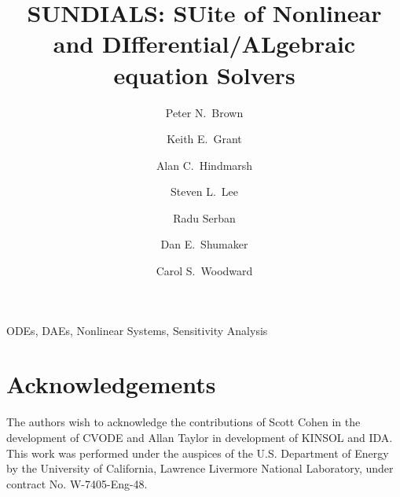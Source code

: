 \documentclass[11pt]{article}
\title{SUNDIALS: SUite of Nonlinear and DIfferential/ALgebraic\\
       equation Solvers}
\author{Peter N.~Brown \and Keith E.~Grant \and Alan C.~Hindmarsh 
\and Steven L.~Lee \and Radu Serban \and Dan E.~Shumaker 
\and Carol S.~Woodward}
\begin{document}

\maketitle

\setcounter{page}{1}



 ODEs, DAEs, Nonlinear Systems,
Sensitivity Analysis




   
   
   








\section{Acknowledgements}

The authors wish to acknowledge the contributions of Scott Cohen
in the development of CVODE and Allan Taylor in development of
KINSOL and IDA.  This work was performed under the auspices of the
U.S. Department of Energy by the University of California,
Lawrence Livermore National Laboratory, under contract No.
W-7405-Eng-48.
\end{document}
